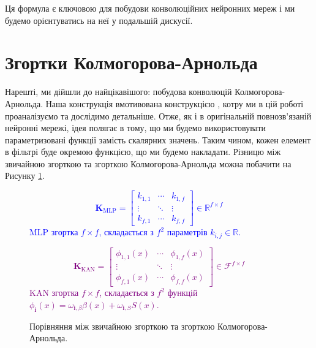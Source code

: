 Ця формула є ключовою для побудови конволюційних нейронних мереж і ми 
будемо орієнтуватись на неї у подальшій дискусії. 

\section{Згортки Колмогорова-Арнольда}\label{section:kolmogorov}

Нарешті, ми дійшли до найцікавішого: побудова конволюцій Колмогорова-Арнольда.
Наша конструкція вмотивована конструкцією \cite{kan-cnn}, котру ми в цій роботі
проаналізуємо та дослідимо детальніше. Отже, як і в оригінальній повнозв'язаній 
нейронні мережі, ідея полягає в тому, що ми будемо використовувати 
параметризовані функції замість скалярних значень. Таким чином, 
кожен елемент в фільтрі буде окремою функцією, що ми будемо накладати.
Різницю між звичайною згорткою та згорткою Колмогорова-Арнольда можна
побачити на Рисунку \ref{fig:kan_conv}.
\begin{figure}
\noindent
    \begin{minipage}{0.48\linewidth}
    \textcolor{blue}{
    \begin{equation*}
    \boldsymbol{K}_{\text{MLP}} = \begin{bmatrix}
        k_{1,1} & \cdots & k_{1,f} \\
        \vdots & \ddots & \vdots \\
        k_{f,1} & \cdots & k_{f,f}
    \end{bmatrix} \in \mathbb{R}^{f \times f}
    \end{equation*}
    MLP згортка $f \times f$, складається з $f^2$ параметрів $k_{i,j} \in \mathbb{R}$.}
    \end{minipage}
    \hfill
    \begin{minipage}{0.48\linewidth}
    \textcolor{purple}{
    \begin{equation*}
    \boldsymbol{K}_{\text{KAN}} = \begin{bmatrix}
        \phi_{1,1}(x) & \cdots & \phi_{1,f}(x) \\
        \vdots & \ddots & \vdots \\
        \phi_{f,1}(x) & \cdots & \phi_{f,f}(x)
    \end{bmatrix} \in \mathcal{F}^{f \times f}
    \end{equation*}
    KAN згортка $f \times f$, складається з $f^2$ функцій
    $\phi_{\boldsymbol{i}}(x)=\omega_{\boldsymbol{i},\beta}\beta(x)+\omega_{\boldsymbol{i},S} S(x)$.}
    \end{minipage}
    \caption{Порівняння між звичайною згорткою та згорткою Колмогорова-Арнольда.}
    \label{fig:kan_conv}
\end{figure}

